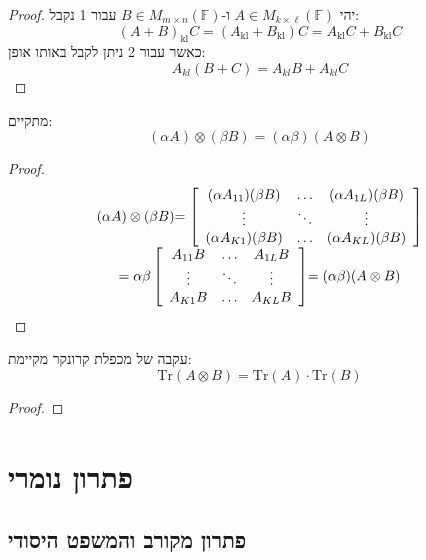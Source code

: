 \documentclass{tstextbook}
\begin{document}
\begin{proof}
יהי \(A \in M_{k\times \ell}\left( \mathbb{F}  \right)\) ו-\(B \in M_{m\times n}\left( \mathbb{F}  \right)\) עבור 1 נקבל:
$${{(A+B)_{\mathrm{{kl}}}C=(A_{\mathrm{{kl}}}+B_{\mathrm{{kl}}})C}}{{=A_{\mathrm{{kl}}}C+B_{\mathrm{{kl}}}C}}$$
כאשר עבור 2 ניתן לקבל באותו אופן:
$$A_{k l}(B+C)=A_{k l}B+A_{k l}C$$

\end{proof}
\begin{proposition}
מתקיים:
$$(\alpha A)\otimes(\beta B)=(\alpha\beta)(A\otimes B)$$

\end{proposition}
\begin{proof}
$$\begin{array}{c}{{(\alpha A)\otimes(\beta B)}} {{=\left[\begin{array}{c c c}{{(\alpha A_{11})(\beta B)}}&{{\ldots}}&{{(\alpha A_{1L})(\beta B)}}\\ {{\vdots}}&{{\ddots}}&{{\vdots}}\\ {{(\alpha A_{K1})(\beta B)}}&{{\ldots}}&{{(\alpha A_{K L})(\beta B)}}\end{array}\right]}}\\ {{=\alpha\beta\left[\begin{array}{c c c}{{A_{11}B}}&{{\ldots}}&{{A_{1L}B}}\\ {{\vdots}}&{{\ddots}}&{{\vdots}}\\ {{A_{K1}B}}&{{\ldots}}&{{A_{K L}B}}\end{array}\right]}}{{=(\alpha\beta)(A\otimes B)}}\end{array}$$

\end{proof}
\begin{proposition}
עקבה של מכפלת קרונקר מקיימת:
$$\mathrm{Tr}\left( A\otimes B \right)=\mathrm{Tr}(A)\cdot \mathrm{Tr}(B)$$

\end{proposition}
\begin{proof}
\end{proof}
\chapter{פתרון נומרי}

\section{פתרון מקורב והמשפט היסודי}
\end{document}

